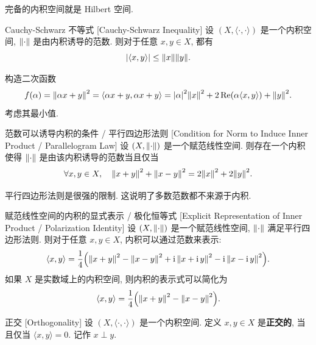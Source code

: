         \begin{rmk}
            [Dedicatia]
            完备的内积空间就是 Hilbert 空间.
        \end{rmk}

        \begin{thm}
            {Cauchy-Schwarz 不等式}
            [Cauchy-Schwarz Inequality]
            设 \((X, \langle\cdot,\cdot\rangle)\) 是一个内积空间, \(\norm{\cdot}\) 是由内积诱导的范数. 则对于任意 \(x,y\in X\), 都有
            \[\abs{\langle x,y\rangle}\leq\norm{x}\norm{y}.\]
        \end{thm}

        \begin{prf}
            构造二次函数 
            \[f(\alpha)=\norm{\alpha x+y}^2=\langle \alpha x+y, \alpha x+y\rangle=\abs{\alpha}^2\norm{x}^2+2\Re(\alpha\langle x,y\rangle)+\norm{y}^2.\]
            考虑其最小值.
        \end{prf}

        \begin{thm}
            {范数可以诱导内积的条件 / 平行四边形法则}
            [Condition for Norm to Induce Inner Product / Parallelogram Law]
            设 \((X, \norm{\cdot})\) 是一个赋范线性空间. 则存在一个内积使得 \(\norm{\cdot}\) 是由该内积诱导的范数当且仅当
            \[\forall x,y\in X, \quad \norm{x+y}^2+\norm{x-y}^2=2\norm{x}^2+2\norm{y}^2.\]
        \end{thm}

        \begin{rmk}
            [Dedicatia]
            平行四边形法则是很强的限制. 这说明了多数范数都不来源于内积.
        \end{rmk}

        \begin{thm}
            {赋范线性空间的内积的显式表示 / 极化恒等式}
            [Explicit Representation of Inner Product / Polarization Identity]
            设 \((X, \norm{\cdot})\) 是一个赋范线性空间, \(\norm{\cdot}\) 满足平行四边形法则. 则对于任意 \(x,y\in X\), 内积可以通过范数来表示:
            \[\langle x,y\rangle=\frac{1}{4}\qty(\norm{x+y}^2-\norm{x-y}^2+ \operatorname{\mathrm{i}}\norm{x+\operatorname{\mathrm{i}} y}^2 - \operatorname{\mathrm{i}}\norm{x-\operatorname{\mathrm{i}} y}^2).\]
            如果 \(X\) 是实数域上的内积空间, 则内积的表示式可以简化为
            \[\langle x,y\rangle=\frac{1}{4}\qty(\norm{x+y}^2-\norm{x-y}^2).\]
        \end{thm}

        \begin{dfn}
            [orthogonality]
            {正交}
            [Orthogonality]
            设 \((X, \langle\cdot,\cdot\rangle)\) 是一个内积空间. 定义 \(x,y\in X\) 是\textbf{正交的}, 当且仅当 \(\langle x,y\rangle=0\). 记作 \(x\perp y\).
        \end{dfn}

